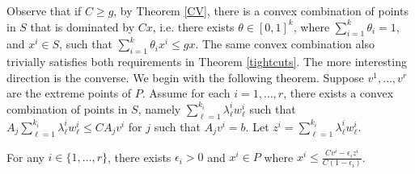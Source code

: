 Observe that if $C\geq g$, by Theorem \ref{CV}, there is a convex combination of points in $S$ that is dominated by $Cx$, i.e. there exists $\theta\in [0,1]^{k}$, where $\sum_{i=1}^{k}\theta_i=1$, and $x^i\in S$, such that $\sum_{i=1}^{k}\theta_ix^i\leq gx$. The same convex combination also trivially satisfies both requirements in Theorem \ref{tightcuts}. The more interesting direction is the converse. We begin with the following theorem. Suppose $v^1,\ldots,v^r$ are the extreme points of $P$. Assume for each $i=1,\ldots,r$, there exists a convex combination of points in $S$, namely $\sum_{\ell=1}^{k_i} \lambda^i_\ell w^i_\ell$ such that $A_j \sum_{\ell=1}^{k_i} \lambda^i_\ell w^i_\ell \leq CA_jv^i$ for $j$ such that $A_jv^i = b$. Let $z^i = \sum_{\ell=1}^{k_i} \lambda^i_\ell w^i_\ell$.
\begin{lemma}\label{epsilon}
	For any  $i\in\{1,\ldots,r\}$, there exists $\epsilon_i >0$ and ${x^i}\in P$ where ${x^i}\leq \frac{Cv^i-\epsilon_i z^i}{C(1-\epsilon_i)}$.
\end{lemma}
